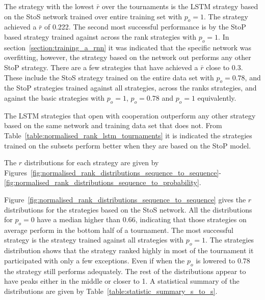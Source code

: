 The strategy with the lowest \(\bar{r}\) over the \metatournamentslstm
tournaments is the LSTM strategy based on the StoS network trained over entire
training set with \(p_o=1\). The strategy achieved a \(\bar{r}\) of 0.222. The
second most successful performance is by the StoP based strategy trained against
across the rank strategies with \(p_o=1\). In
section~\ref{section:training_a_rnn} it was indicated that the specific network
was overfitting, however, the strategy based on the network out performs any
other StoP strategy. There are a few strategies that have achieved a \(\bar{r}\)
close to 0.3. These include the StoS strategy trained on the entire data set
with \(p_o=0.78\), and the StoP strategies trained against all strategies,
across the ranks strategies, and against the basic strategies with \(p_o=1\),
\(p_o=0.78\) and \(p_o=1\) equivalently.

The LSTM strategies that open with cooperation outperform any other strategy
based on the same network and training data set that does not. From
Table~\ref{table:normalised_rank_lstm_tournaments} it is indicated the
strategies trained on the subsets perform better when they are based on the StoP
model.

The \(r\) distributions for each strategy are given by
Figures~\ref{fig:normalised_rank_distributions_sequence_to_sequence}-
\ref{fig:normalised_rank_distributions_sequence_to_probability}.

Figure~\ref{fig:normalised_rank_distributions_sequence_to_sequence} gives the
\(r\) distributions for the strategies based on the StoS network. All the
distributions for \(p_o=0\) have a median higher than 0.66, indicating that
those strategies on average perform in the bottom half of a tournament. The most
successful strategy is the strategy trained against all strategies with
\(p_o=1\). The strategies distribution shows that the strategy ranked highly in
most of the tournament it participated with only a few exceptions. Even if when
the \(p_o\) is lowered to 0.78 the strategy still performs adequately. The rest
of the distributions appear to have peaks either in the middle or closer to 1. A
statistical summary of the distributions are given by
Table~\ref{table:statistic_summary_s_to_s}.

